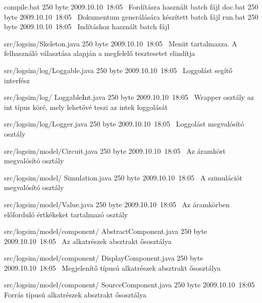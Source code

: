\begin{fajllista}

\fajl
{compile.bat} %
{250 byte} %
{2009.10.10~18:05~} %
{Fordításra használt batch fájl} %
\fajl
{doc.bat} %
{250 byte} %
{2009.10.10~18:05~} %
{Dokumentum generálására készített batch fájl} %
\fajl
{run.bat} %
{250 byte} %
{2009.10.10~18:05~} %
{Indításhoz használt batch fájl} %

\fajl
{src/logsim/Skeleton.java} %
{250 byte} %
{2009.10.10~18:05~} %
{Menüt tartalmazza. A felhasználó választása alapján a megfelelő tesztesetet elindítja} %

\fajl
{src/logsim/log/Loggable.java} %
{250 byte} %
{2009.10.10~18:05~} %
{Loggolást segítő interfész} %

\fajl
{src/logsim/log/\newline
LoggableInt.java} %
{250 byte} %
{2009.10.10~18:05~} %
{Wrapper osztály az int típus köré, mely lehetővé teszi az intek loggolását} %

\fajl
{src/logsim/log/Logger.java} %
{250 byte} %
{2009.10.10~18:05~} %
{Loggolást megvalósító osztály} %

\fajl
{src/logsim/model/Circuit.java} %
{250 byte} %
{2009.10.10~18:05~} %
{Az áramkört megvalósító osztály} %

\fajl
{src/logsim/model/\newline
Simulation.java} %
{250 byte} %
{2009.10.10~18:05~} %
{A szimulációt megvalósító osztály} %

\fajl
{src/logsim/model/Value.java} %
{250 byte} %
{2009.10.10~18:05~} %
{Az áramkörben előforduló értkékeket tartalmazó osztály} %

\fajl
{src/logsim/model/component/\newline
AbstractComponent.java} %
{250 byte} %
{2009.10.10~18:05~} %
{Az alkatrészek absztrakt ősosztálya} %

\fajl
{src/logsim/model/component/\newline
DisplayComponent.java} %
{250 byte} %
{2009.10.10~18:05~} %
{Megjelenítő típusú alkatrészek absztrakt ősosztálya} %

\fajl
{src/logsim/model/component/\newline
SourceComponent.java} %
{250 byte} %
{2009.10.10~18:05~} %
{Forrás típusú alkatrészek absztrakt ősosztálya} %


\end{fajllista}
